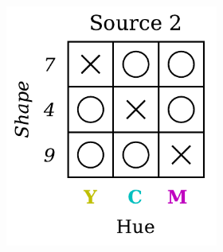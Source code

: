 \begin{dataset}
\begin{figure}[H]
\begin{subfigure}[b]{0.45\textwidth}
\begin{subfigure}[b]{0.48\textwidth}
                \includegraphics[width=\textwidth]{img/datasets/ZGO_fact=hue_env=1.pdf}
            \end{subfigure}
        \end{subfigure}
        \hfill
        \begin{subfigure}[b]{0.45\textwidth}
            \centering
            \begin{subfigure}[b]{0.48\textwidth}
                \centering

\end{subfigure}
\end{subfigure}
\end{figure}
\end{dataset}
